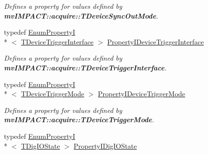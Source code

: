 \begin{DoxyCompactItemize}
\begin{DoxyCompactList}\small\item\em Defines a property for values defined by {\bfseries mv\+I\+M\+P\+A\+C\+T\+::acquire\+::\+T\+Device\+Sync\+Out\+Mode}. \end{DoxyCompactList}\item 
\hypertarget{group___device_specific_interface_gabc51afc4a0e6c169f166ee32bbe45b78}{typedef \hyperlink{classmv_i_m_p_a_c_t_1_1acquire_1_1_enum_property_i}{Enum\+Property\+I}\\*
$<$ \hyperlink{group___device_specific_interface_gac3ca527d649e5a24d75535f263bb5b8a}{T\+Device\+Trigger\+Interface} $>$ \hyperlink{group___device_specific_interface_gabc51afc4a0e6c169f166ee32bbe45b78}{Property\+I\+Device\+Trigger\+Interface}}\label{group___device_specific_interface_gabc51afc4a0e6c169f166ee32bbe45b78}

\begin{DoxyCompactList}\small\item\em Defines a property for values defined by {\bfseries mv\+I\+M\+P\+A\+C\+T\+::acquire\+::\+T\+Device\+Trigger\+Interface}. \end{DoxyCompactList}\item 
\hypertarget{group___device_specific_interface_gaac7cb59349519ed98d73b8605c3dec64}{typedef \hyperlink{classmv_i_m_p_a_c_t_1_1acquire_1_1_enum_property_i}{Enum\+Property\+I}\\*
$<$ \hyperlink{group___device_specific_interface_ga01d26702f49062f849cb0ce7f517a753}{T\+Device\+Trigger\+Mode} $>$ \hyperlink{group___device_specific_interface_gaac7cb59349519ed98d73b8605c3dec64}{Property\+I\+Device\+Trigger\+Mode}}\label{group___device_specific_interface_gaac7cb59349519ed98d73b8605c3dec64}

\begin{DoxyCompactList}\small\item\em Defines a property for values defined by {\bfseries mv\+I\+M\+P\+A\+C\+T\+::acquire\+::\+T\+Device\+Trigger\+Mode}. \end{DoxyCompactList}\item 
\hypertarget{group___device_specific_interface_ga26369d2e6b583ee092988de00a839413}{typedef \hyperlink{classmv_i_m_p_a_c_t_1_1acquire_1_1_enum_property_i}{Enum\+Property\+I}\\*
$<$ \hyperlink{group___device_specific_interface_gaa68dd10eeb8003b9f18ac351221a57cc}{T\+Dig\+I\+O\+State} $>$ \hyperlink{group___device_specific_interface_ga26369d2e6b583ee092988de00a839413}{Property\+I\+Dig\+I\+O\+State}}\label{group___device_specific_interface_ga26369d2e6b583ee092988de00a839413}


\end{DoxyCompactItemize}
